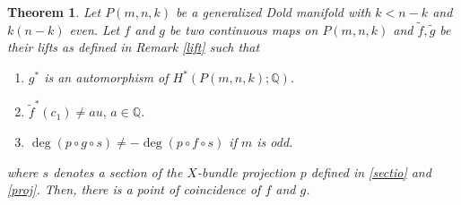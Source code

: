 \documentclass{amsart}
\newtheorem{theorem}{Theorem}[section]
\begin{document}
\begin{theorem}\label{coincidence thm}
	Let $P(m,n,k)$ be a generalized Dold manifold with $k<n-k$ and $k(n-k)$ even. Let $f$ and $g$ be two continuous maps on $P(m,n,k)$ and $\tilde f, \tilde g$ be their lifts as defined in  Remark \ref{lift} such that
	\begin{enumerate}	
		\item $g^*$ is an automorphism of $H^*(P(m,n,k);\mathbb Q)$. 
		\item $\tilde{f}^*(c_1) \neq au,\, a \in \mathbb{Q}$.
		\item $\deg(p\circ g \circ s)\neq -\deg (p\circ f\circ s)$ if $m$ is odd.
	\end{enumerate}
	where $s$ denotes a section of the $X$-bundle projection $p$ defined in \eqref{sectio} and \eqref{proj}.	Then, there is a point of coincidence of $f$ and  $g$.
\end{theorem}
\end{document}

